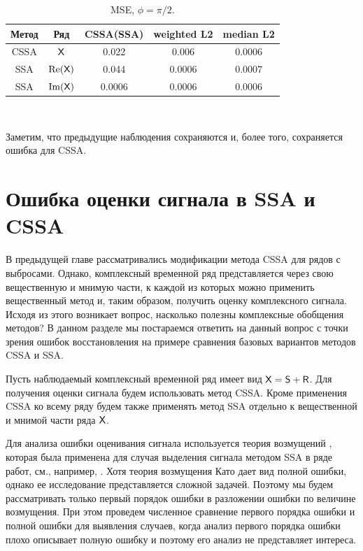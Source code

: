 \documentclass[specialist,
               substylefile = spbu.rtx,
               subf,href,colorlinks=true, 12pt]{disser}
\begin{document}
\begin{table}[H]
	\caption{MSE, $\phi = \pi/2$.}
	\label{tab:re_outl_exp}
	\begin{center}
		\begin{tabular}{|c|c|c|c|c|}
			\hline
			Метод & Ряд & CSSA(SSA) & weighted L2 & median L2\\
			\hline
			CSSA & $\textsf{X}$ & 0.022 & 0.006 & 0.0006\\
			\hline
			SSA & $\Re(\textsf{X})$ & 0.044 & 0.0006 &   0.0007\\
			\hline
			SSA & $\Im(\textsf{X})$ & 0.0006   & 0.0006 &   0.0006\\
			\hline
		\end{tabular} \\
	\end{center}
\end{table}

Заметим, что предыдущие наблюдения сохраняются и, более того, сохраняется ошибка для CSSA.

\chapter{Ошибка оценки сигнала в SSA и CSSA}
\label{ch:perturb}
В предыдущей главе рассматривались модификации метода CSSA для рядов с выбросами. 
Однако, комплексный временной ряд представляется через свою вещественную и мнимую части, к каждой из которых можно применить вещественный метод и, таким образом, получить оценку комплексного сигнала. Исходя из этого возникает вопрос, насколько полезны комплексные обобщения методов? В данном разделе мы постараемся ответить на данный вопрос с точки зрения ошибок восстановления на примере сравнения базовых вариантов методов CSSA и SSA.

Пусть наблюдаемый комплексный временной ряд имеет вид $\textsf{X} =\textsf{S} + \textsf{R}$. Для получения оценки сигнала будем использовать метод CSSA. Кроме применения CSSA ко всему ряду будем также применять метод SSA отдельно к вещественной и мнимой части ряда $\textsf{X}$.

Для анализа ошибки оценивания сигнала используется теория возмущений \cite{Kato}, которая была применена для случая выделения сигнала методом SSA в ряде работ, см., например, \cite{Nekrutkin}.
Хотя теория возмущения Като дает вид полной ошибки, однако ее исследование представляется сложной задачей. Поэтому мы будем рассматривать только первый порядок ошибки в разложении ошибки по величине возмущения.
При этом проведем численное сравнение первого порядка ошибки и полной ошибки для выявления случаев, когда анализ первого порядка ошибки плохо описывает полную ошибку и поэтому его анализ не представляет интереса.
\end{document}
